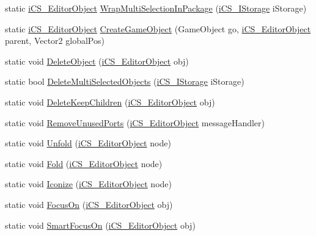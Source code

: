 \begin{DoxyCompactItemize}
\item 
static \hyperlink{classi_c_s___editor_object}{i\+C\+S\+\_\+\+Editor\+Object} \hyperlink{classi_c_s___user_commands_af039c4fd8aeaeb8c17b6b82a0e49089e}{Wrap\+Multi\+Selection\+In\+Package} (\hyperlink{classi_c_s___i_storage}{i\+C\+S\+\_\+\+I\+Storage} i\+Storage)
\item 
static \hyperlink{classi_c_s___editor_object}{i\+C\+S\+\_\+\+Editor\+Object} \hyperlink{classi_c_s___user_commands_ac080bc20131cd7e274a47b0f6d34f9ed}{Create\+Game\+Object} (Game\+Object go, \hyperlink{classi_c_s___editor_object}{i\+C\+S\+\_\+\+Editor\+Object} parent, Vector2 global\+Pos)
\item 
static void \hyperlink{classi_c_s___user_commands_ab00ad0fd0372601e87e6bf9a3b2e08a2}{Delete\+Object} (\hyperlink{classi_c_s___editor_object}{i\+C\+S\+\_\+\+Editor\+Object} obj)
\item 
static bool \hyperlink{classi_c_s___user_commands_ae14cc182ec0240e278e757f438613a0b}{Delete\+Multi\+Selected\+Objects} (\hyperlink{classi_c_s___i_storage}{i\+C\+S\+\_\+\+I\+Storage} i\+Storage)
\item 
static void \hyperlink{classi_c_s___user_commands_a21e34cd3d6455e72bc63106783d30dfa}{Delete\+Keep\+Children} (\hyperlink{classi_c_s___editor_object}{i\+C\+S\+\_\+\+Editor\+Object} obj)
\item 
static void \hyperlink{classi_c_s___user_commands_abf7a5557af4e9604631b404555632dac}{Remove\+Unused\+Ports} (\hyperlink{classi_c_s___editor_object}{i\+C\+S\+\_\+\+Editor\+Object} message\+Handler)
\item 
static void \hyperlink{classi_c_s___user_commands_a1de8a5b3e87b30bd495bff0465089f3d}{Unfold} (\hyperlink{classi_c_s___editor_object}{i\+C\+S\+\_\+\+Editor\+Object} node)
\item 
static void \hyperlink{classi_c_s___user_commands_a3271e846d7a43f4a866747c40611967b}{Fold} (\hyperlink{classi_c_s___editor_object}{i\+C\+S\+\_\+\+Editor\+Object} node)
\item 
static void \hyperlink{classi_c_s___user_commands_a536f98f5a0a532e2eb717249e8717c40}{Iconize} (\hyperlink{classi_c_s___editor_object}{i\+C\+S\+\_\+\+Editor\+Object} node)
\item 
static void \hyperlink{classi_c_s___user_commands_abe74c107e7f04890ef9db05f4037e64e}{Focus\+On} (\hyperlink{classi_c_s___editor_object}{i\+C\+S\+\_\+\+Editor\+Object} obj)
\item 
static void \hyperlink{classi_c_s___user_commands_a06fa6f6cca8bc381ed165d19664c1ea7}{Smart\+Focus\+On} (\hyperlink{classi_c_s___editor_object}{i\+C\+S\+\_\+\+Editor\+Object} obj)

\end{DoxyCompactItemize}
